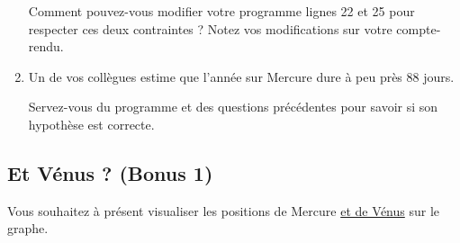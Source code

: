 \documentclass[12pt]{article}
\begin{document}
\begin{enumerate}
Comment pouvez-vous modifier votre programme lignes 22 et 25 pour respecter ces deux contraintes ?  Notez vos modifications sur votre compte-rendu. 

 \begin{center}
\end{center}




\item \ar\va Un de vos collègues estime  que  l'année sur Mercure dure à peu près 88 jours.

Servez-vous du programme et des questions précédentes pour savoir si son hypothèse est correcte. 





\end{enumerate}









\subsection{Et Vénus ? (Bonus 1)}



Vous souhaitez à présent visualiser les positions de Mercure \underline{et de Vénus} sur le graphe.
\end{document}
